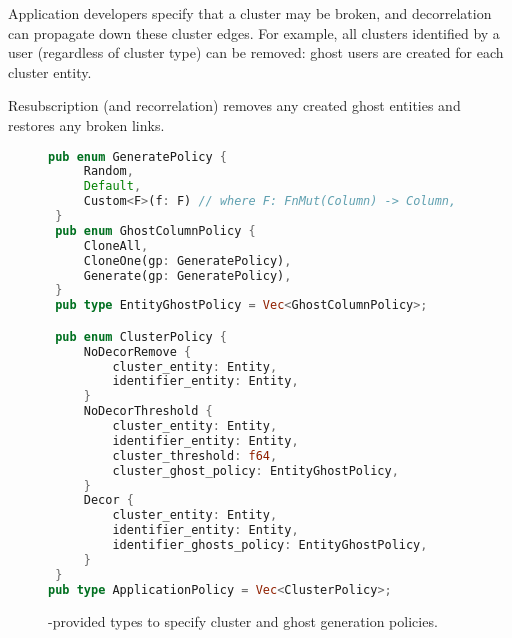 Application developers specify that a cluster may be broken, and decorrelation can propagate down
these cluster edges.
For example, all clusters identified by a user (regardless of cluster type) can be removed: ghost
users are created for each cluster entity.

Resubscription (and recorrelation) removes any created ghost entities and restores any broken links.


\begin{figure}
\begin{lstlisting}[language=Rust]
 pub enum GeneratePolicy {
     Random,
     Default,
     Custom<F>(f: F) // where F: FnMut(Column) -> Column,
 }
 pub enum GhostColumnPolicy {
     CloneAll,
     CloneOne(gp: GeneratePolicy),
     Generate(gp: GeneratePolicy),
 }
 pub type EntityGhostPolicy = Vec<GhostColumnPolicy>;

 pub enum ClusterPolicy {
     NoDecorRemove {
         cluster_entity: Entity,
         identifier_entity: Entity,
     }
     NoDecorThreshold {
         cluster_entity: Entity,
         identifier_entity: Entity,
         cluster_threshold: f64,
         cluster_ghost_policy: EntityGhostPolicy,
     }
     Decor {
         cluster_entity: Entity,
         identifier_entity: Entity,
         identifier_ghosts_policy: EntityGhostPolicy,
     }
 }
pub type ApplicationPolicy = Vec<ClusterPolicy>;
\end{lstlisting}
    \caption{\sys{}-provided types to specify cluster and ghost generation policies.}
\end{figure}



